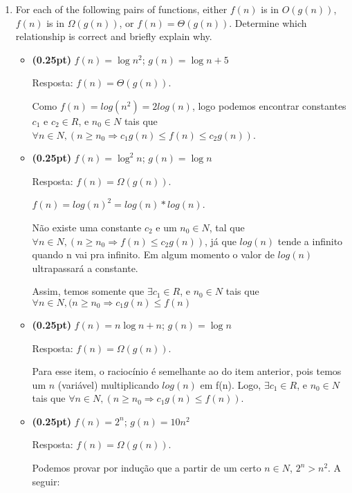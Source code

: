\documentclass{article}
\begin{document}
\begin{enumerate}[label=\Alph*]
  \item For each of the following pairs of functions, either $f(n)$ is in $O(g(n))$, $f(n)$ is in $\Omega(g(n))$, or $f(n) = \Theta(g(n))$. Determine which relationship is correct and briefly explain why.
    \begin{itemize}
      \item \textbf{(0.25pt)} $f(n) = \log n^2$; $g(n) = \log n + 5$
      
      Resposta: $f(n) = \Theta(g(n))$. 
      
      Como $f(n) = log(n^{2}) = 2log(n)$, logo podemos encontrar constantes $c_{1}$ e $c_{2} \in R$, e  $n_{0} \in N$ tais que $ \forall n \in N, (n \geq n_{0} \Rightarrow c_{1}g(n) \leq f(n) \leq c_{2}g(n))$.
      
      \item \textbf{(0.25pt)} $f(n) = \log^2 n$; $g(n) = \log n$
      
     Resposta:  $f(n) = \Omega(g(n))$. 
      
      $f(n) = log(n)^{2} = log(n) * log(n)$.
      
      Não existe uma constante $c_{2}  $ e um $ n_{0}  \in N$, tal que $ \forall n \in N, (n \geq n_{0} \Rightarrow f(n) \leq c_{2}g(n))$, já que $log(n)$ tende a infinito quando n vai pra infinito. Em algum momento o valor de $log(n)$ ultrapassará a constante. 
      
      Assim, temos somente que  $ \exists c_{1} \in R$, e  $n_{0} \in N$ tais que $ \forall n \in N, (n \geq n_{0} \Rightarrow c_{1}g(n) \leq f(n)$
      
      \item \textbf{(0.25pt)} $f(n) = n\log n + n$; $g(n) = \log n$
      
     Resposta:  $f(n) = \Omega(g(n))$. 
      
      Para esse item, o raciocínio é semelhante ao do item anterior, pois temos um $n$ (variável) multiplicando $log(n)$ em f(n). Logo, $ \exists c_{1} \in R$, e  $n_{0} \in N$ tais que $ \forall n \in N, (n \geq n_{0} \Rightarrow c_{1}g(n) \leq f(n)).$
      
      \item \textbf{(0.25pt)} $f(n) = 2^n$; $g(n) = 10n^2$           
      
      Resposta:  $f(n) =  \Omega (g(n))$. 
      
      Podemos provar por indução que a partir de um certo $n \in N$, $2^{n} > n^{2}$. A seguir:
      

\end{itemize}
\end{enumerate}
\end{document}
